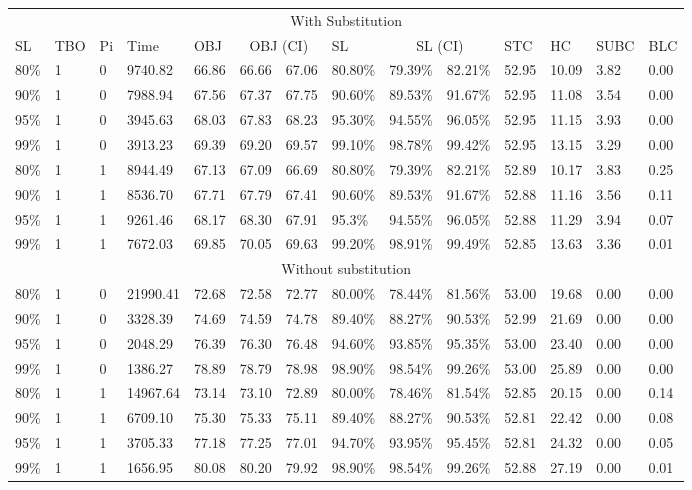 \documentclass[10pt]{article}
\begin{document}
\begin{table}[]
\begin{tabular}{llllllllllllll}
\multicolumn{14}{c}{With Substitution} \\
SL & TBO & Pi & Time & OBJ & \multicolumn{2}{c}{OBJ (CI)} & SL & \multicolumn{2}{c}{SL (CI)} & STC & HC & SUBC & BLC \\
80\% & 1 & 0 & 9740.82 & 66.86 & 66.66 & 67.06 & 80.80\% & 79.39\% & 82.21\% & 52.95 & 10.09 & 3.82 & 0.00 \\
90\% & 1 & 0 & 7988.94 & 67.56 & 67.37 & 67.75 & 90.60\% & 89.53\% & 91.67\% & 52.95 & 11.08 & 3.54 & 0.00 \\
95\% & 1 & 0 & 3945.63 & 68.03 & 67.83 & 68.23 & 95.30\% & 94.55\% & 96.05\% & 52.95 & 11.15 & 3.93 & 0.00 \\
99\% & 1 & 0 & 3913.23 & 69.39 & 69.20 & 69.57 & 99.10\% & 98.78\% & 99.42\% & 52.95 & 13.15 & 3.29 & 0.00 \\
80\% & 1 & 1 & 8944.49 & 67.13 & 67.09 & 66.69 & 80.80\% & 79.39\% & 82.21\% & 52.89 & 10.17 & 3.83 & 0.25 \\
90\% & 1 & 1 & 8536.70 & 67.71 & 67.79 & 67.41 & 90.60\% & 89.53\% & 91.67\% & 52.88 & 11.16 & 3.56 & 0.11 \\
95\% & 1 & 1 & 9261.46 & 68.17 & 68.30 & 67.91 & 95.3\% & 94.55\% & 96.05\% & 52.88 & 11.29 & 3.94 & 0.07 \\
99\% & 1 & 1 & 7672.03 & 69.85 & 70.05 & 69.63 & 99.20\% & 98.91\% & 99.49\% & 52.85 & 13.63 & 3.36 & 0.01 \\
\multicolumn{14}{c}{Without substitution} \\
80\% & 1 & 0 & 21990.41 & 72.68 & 72.58 & 72.77 & 80.00\% & 78.44\% & 81.56\% & 53.00 & 19.68 & 0.00 & 0.00 \\
90\% & 1 & 0 & 3328.39 & 74.69 & 74.59 & 74.78 & 89.40\% & 88.27\% & 90.53\% & 52.99 & 21.69 & 0.00 & 0.00 \\
95\% & 1 & 0 & 2048.29 & 76.39 & 76.30 & 76.48 & 94.60\% & 93.85\% & 95.35\% & 53.00 & 23.40 & 0.00 & 0.00 \\
99\% & 1 & 0 & 1386.27 & 78.89 & 78.79 & 78.98 & 98.90\% & 98.54\% & 99.26\% & 53.00 & 25.89 & 0.00 & 0.00 \\
80\% & 1 & 1 & 14967.64 & 73.14 & 73.10 & 72.89 & 80.00\% & 78.46\% & 81.54\% & 52.85 & 20.15 & 0.00 & 0.14 \\
90\% & 1 & 1 & 6709.10 & 75.30 & 75.33 & 75.11 & 89.40\% & 88.27\% & 90.53\% & 52.81 & 22.42 & 0.00 & 0.08 \\
95\% & 1 & 1 & 3705.33 & 77.18 & 77.25 & 77.01 & 94.70\% & 93.95\% & 95.45\% & 52.81 & 24.32 & 0.00 & 0.05 \\
99\% & 1 & 1 & 1656.95 & 80.08 & 80.20 & 79.92 & 98.90\% & 98.54\% & 99.26\% & 52.88 & 27.19 & 0.00 & 0.01
\end{tabular}
\end{table}
\end{document}
